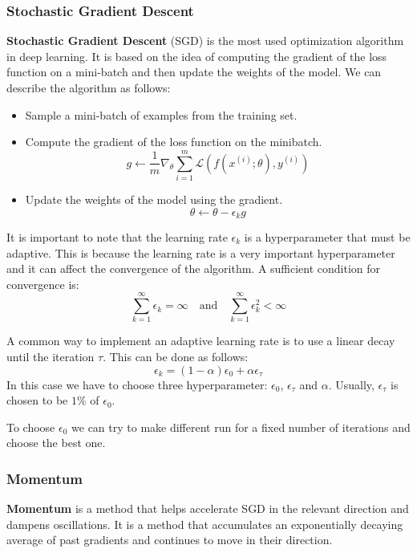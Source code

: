 \subsubsection{Stochastic Gradient Descent}
\textbf{Stochastic Gradient Descent} (SGD) is the most used optimization algorithm
in deep learning. It is based on the idea of computing the gradient of the loss
function on a mini-batch and then update the weights of the model. We can describe
the algorithm as follows:
\begin{itemize}
    \item Sample a mini-batch of examples from the training set.
    \item Compute the gradient of the loss function on the minibatch.
          \begin{equation}
              g \gets \frac{1}{m} \nabla_\theta \sum_{i=1}^m \mathcal{L}(f(x^{(i)}; \theta), y^{(i)})
          \end{equation}
    \item Update the weights of the model using the gradient.
          \begin{equation}
              \theta \gets \theta - \epsilon_k g
          \end{equation}
\end{itemize}
It is important to note that the learning rate $\epsilon_k$ is a hyperparameter
that must be adaptive. This is because the learning rate is a very important
hyperparameter and it can affect the convergence of the algorithm. A sufficient
condition for convergence is:
\begin{equation*}
    \sum_{k=1}^\infty \epsilon_k = \infty \quad \text{and} \quad \sum_{k=1}^\infty \epsilon_k^2 < \infty
\end{equation*}

A common way to implement an adaptive learning rate is to use a linear decay
until the iteration $\tau$. This can be done as follows:
\begin{equation}
    \epsilon_k = \left(1 - \alpha\right)\epsilon_0 + \alpha \epsilon_\tau
\end{equation}
In this case we have to choose three hyperparameter: $\epsilon_0$, $\epsilon_\tau$
and $\alpha$. Usually, $\epsilon_\tau$ is chosen to be $1\%$ of $\epsilon_0$.

To choose $\epsilon_0$ we can try to make different run for a fixed number of
iterations and choose the best one.
\subsubsection{Momentum}
\textbf{Momentum} is a method that helps accelerate SGD in the relevant direction
and dampens oscillations. It is a method that accumulates an exponentially decaying
average of past gradients and continues to move in their direction.

